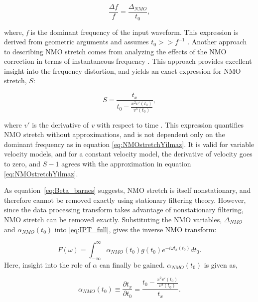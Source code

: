 \begin{equation}
  \frac{\Delta f}{f}=\frac{\Delta _{NMO}}{t_0},
\label{eq:NMOstretchYilmaz}
\end{equation}

\noindent where, \textit{f} is the dominant frequency of the input waveform.  This expression is derived from geometric arguments and assumes $t_0>>f^{-1}$ \citep{yilmaz01}.  Another approach to describing NMO stretch comes from analyzing the effects of the NMO correction in terms of instantaneous frequency \citep{barnes92}.  This approach provides excellent insight into the frequency distortion, and yields an exact expression for NMO stretch, $S$:

\begin{equation}
S=\frac{t_x}{t_0-\frac{x^2v'\left(t_0\right)}{v^3\left(t_0\right)}},
\label{eq:Beta_barnes}
\end{equation}

\noindent where $v'$ is the derivative of \textit{v} with respect to time \citep{barnes92}.  This expression quantifies NMO stretch without approximations, and is not dependent only on the dominant frequency as in equation \ref{eq:NMOstretchYilmaz}.  It is valid for variable velocity models, and for a constant velocity model, the derivative of velocity goes to zero, and $S-1$ agrees with the approximation in equation \ref{eq:NMOstretchYilmaz}.  

As equation~\ref{eq:Beta_barnes} suggests, NMO stretch is itself nonstationary, and therefore cannot be removed exactly using stationary filtering theory.  However, since the data processing transform takes advantage of nonstationary filtering, NMO stretch can be removed exactly.  Substituting the NMO variables, $\Delta_{NMO}$ and $\alpha_{NMO}\left( t_0\right) $ into \ref{eq:IPT_full}, gives the inverse NMO transform:

\begin{equation}
F(\omega )=\int _{-\infty }^{\infty }\alpha _{NMO}\left( t_0\right) g\left(t_0\right)e^{-i \omega t_x\left(t_0\right)}dt_0.
\label{eq:INMOT_full}
\end{equation}
Here, insight into the role of $\alpha$ can finally be gained. $\alpha_{NMO}\left( t_0\right) $ is given as,

\begin{equation}
\alpha _{NMO}\left( t_0\right) \equiv \frac{\partial t_x}{\partial t_0}=\frac{t_0-\frac{x^2v'\left(t_0\right)}{v^3\left(t_0\right)}}{t_x}.
\label{eq:Alpha_NMO}
\end{equation}

